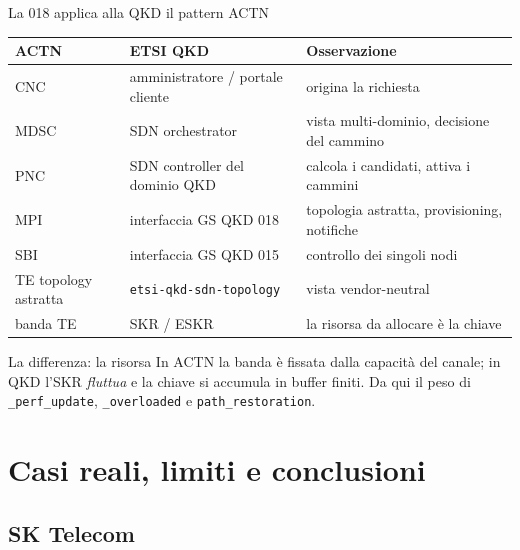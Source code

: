 \documentclass[10pt]{beamer}
\begin{document}
\begin{frame}{La 018 applica alla QKD il pattern ACTN}
  \footnotesize
  \begin{tabularx}{\textwidth}{@{}l l L@{}}
    \toprule
    \textbf{ACTN} & \textbf{ETSI QKD} & \textbf{Osservazione} \\
    \midrule
    CNC & amministratore / portale cliente & origina la richiesta \\
    MDSC & SDN orchestrator & vista multi-dominio, decisione del cammino \\
    PNC & SDN controller del dominio QKD & calcola i candidati, attiva i cammini \\
    MPI & interfaccia GS QKD 018 & topologia astratta, provisioning, notifiche \\
    SBI & interfaccia GS QKD 015 & controllo dei singoli nodi \\
    TE topology astratta & \texttt{etsi-qkd-sdn-topology} & vista vendor-neutral \\
    banda TE & SKR / ESKR & la risorsa da allocare è la chiave \\
    \bottomrule
  \end{tabularx}
  \vspace{1ex}
  \begin{alertblock}{La differenza: la risorsa}
    In ACTN la banda è fissata dalla capacità del canale; in QKD l'SKR
    \emph{fluttua} e la chiave si accumula in buffer finiti. Da qui il peso
    di \texttt{\_perf\_update}, \texttt{\_overloaded} e
    \texttt{path\_restoration}.
  \end{alertblock}
\end{frame}

\section[Casi reali e conclusioni]{Casi reali, limiti e conclusioni}

\subsection{SK Telecom}
\end{document}
